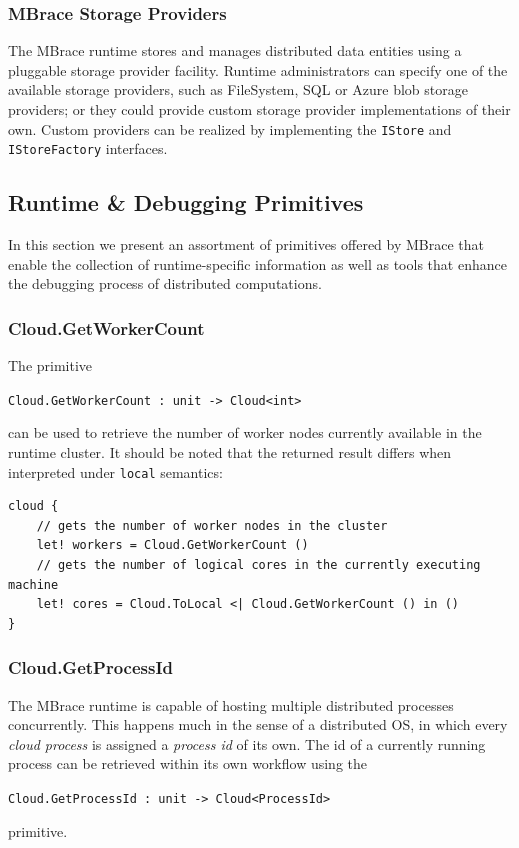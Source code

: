 \documentclass[9pt,a4paper]{article}
\newcommand{\mbrace}{MBrace}
\newcommand{\TitularMbrace}{MBrace}
\newcommand{\centertt}[1]{\begin{center}\texttt{#1}\end{center}}
\begin{document}
\subsubsection*{\TitularMbrace{} Storage Providers}

The \mbrace{} runtime stores and manages distributed data entities using a
pluggable storage provider facility. Runtime administrators can specify one
of the available storage providers, such as FileSystem, SQL or Azure blob storage
providers; or they could provide custom storage provider implementations of their own.
Custom providers can be realized by implementing the \texttt{IStore} and
\texttt{IStoreFactory} interfaces.

\subsection{Runtime \& Debugging Primitives}

In this section we present an assortment of primitives offered by \mbrace{}
that enable the collection of runtime-specific information as well as tools
that enhance the debugging process of distributed computations.

\subsubsection*{Cloud.GetWorkerCount}

The primitive
\centertt{Cloud.GetWorkerCount : unit -> Cloud<int>} 
can be used to retrieve the number of worker nodes currently available in the 
runtime cluster. It should be noted that the returned result differs when
interpreted under \texttt{local} semantics:
\begin{lstlisting}
cloud {
	// gets the number of worker nodes in the cluster
	let! workers = Cloud.GetWorkerCount ()
	// gets the number of logical cores in the currently executing machine
	let! cores = Cloud.ToLocal <| Cloud.GetWorkerCount () in ()
}
\end{lstlisting}

\subsubsection*{Cloud.GetProcessId}

The \mbrace{} runtime is capable of hosting multiple distributed processes concurrently.
This happens much in the sense of a distributed OS, in which every \emph{cloud process}
is assigned a \emph{process id} of its own. The id of a currently running process can
be retrieved within its own workflow using the
\centertt{Cloud.GetProcessId : unit -> Cloud<ProcessId>}
primitive.
\end{document}
